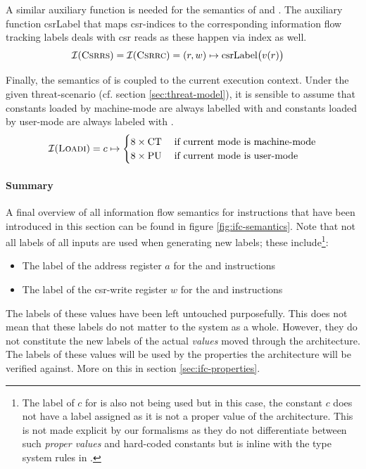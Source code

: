 A similar auxiliary function is needed for the semantics of  and .
The auxiliary function \mbox{csrLabel} that maps \gls{csr}-indices to the corresponding information flow tracking labels deals with \gls{csr} reads as these happen via index as well.
\begin{align*}
    \mathcal{I}(\textsc{Csrrs}) = \mathcal{I}(\textsc{Csrrc}) &= (r, w) \mapsto \text{csrLabel}\big(v(r) \big)
\end{align*}

Finally, the semantics of  is coupled to the current execution context.
Under the given threat-scenario (cf. section \ref{sec:threat-model}), it is sensible to assume that constants loaded by machine-mode are always labelled with \CT{} and constants loaded by user-mode are always labeled with \PU{}.
\begin{equation*}
    \mathcal{I}(\textsc{Loadi}) = c \mapsto \begin{cases}
        8 \times \text{CT} & \; \text{if current mode is machine-mode} \\
        8 \times \text{PU} & \; \text{if current mode is user-mode}
    \end{cases}
\end{equation*}

\paragraph{Summary}
A final overview of all information flow semantics for instructions that have been introduced in this section can be found in figure \ref{fig:ifc-semantics}.
Note that not all labels of all inputs are used when generating new labels; these include\footnote{%
    The label of $ c $ for  is also not being used but in this case, the constant $ c $ does not have a label assigned as it is not a proper value of the architecture.
    This is not made explicit by our formalisms as they do not differentiate between such \textit{proper values} and hard-coded constants but is inline with the type system rules in \cite{Ferraiuolo17}.
}:
\begin{itemize}
    \item The label of the address register $ a $ for the  and  instructions
    \item The label of the \gls{csr}-write register $ w $ for the  and  instructions
\end{itemize}

The labels of these values have been left untouched purposefully.
This does not mean that these labels do not matter to the system as a whole.
However, they do not constitute the new labels of the actual \textit{values} moved through the architecture.
The labels of these values will be used by the properties the architecture will be verified against.
More on this in section \ref{sec:ifc-properties}.

